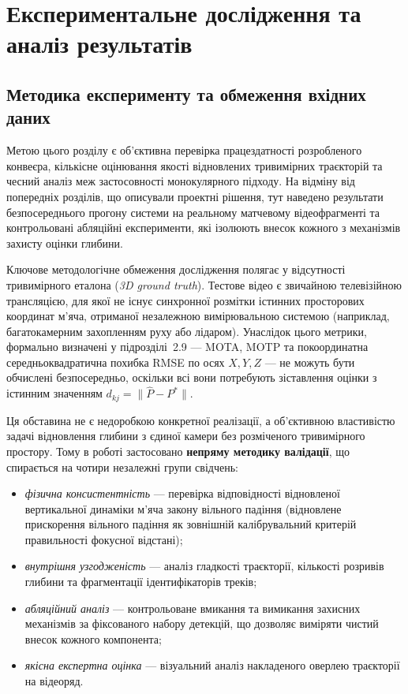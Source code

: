 

\section{Експериментальне дослідження та аналіз результатів}

\subsection{Методика експерименту та обмеження вхідних даних}

Метою цього розділу є об'єктивна перевірка працездатності розробленого конвеєра,
кількісне оцінювання якості відновлених тривимірних траєкторій та чесний аналіз
меж застосовності монокулярного підходу. На відміну від попередніх розділів, що
описували проектні рішення, тут наведено результати безпосереднього прогону системи
на реальному матчевому відеофрагменті та контрольовані абляційні експерименти, які
ізолюють внесок кожного з механізмів захисту оцінки глибини.

Ключове методологічне обмеження дослідження полягає у відсутності тривимірного
еталона (\textit{3D ground truth}). Тестове відео є звичайною телевізійною
трансляцією, для якої не існує синхронної розмітки істинних просторових координат
м'яча, отриманої незалежною вимірювальною системою (наприклад, багатокамерним
захопленням руху або лідаром). Унаслідок цього метрики, формально визначені у
підрозділі~2.9 --- MOTA, MOTP та покоординатна середньоквадратична похибка RMSE по
осях $X, Y, Z$ --- не можуть бути обчислені безпосередньо, оскільки всі вони
потребують зіставлення оцінки з істинним значенням $d_{kj} = \lVert \hat{P} - P^{*} \rVert$.

Ця обставина не є недоробкою конкретної реалізації, а об'єктивною властивістю задачі
відновлення глибини з єдиної камери без розміченого тривимірного простору. Тому в роботі
застосовано \textbf{непряму методику валідації}, що спирається на чотири незалежні
групи свідчень:
\begin{itemize}
    \item \textit{фізична консистентність} --- перевірка відповідності відновленої
    вертикальної динаміки м'яча закону вільного падіння (відновлене прискорення
    вільного падіння як зовнішній калібрувальний критерій правильності фокусної відстані);
    \item \textit{внутрішня узгодженість} --- аналіз гладкості траєкторії, кількості
    розривів глибини та фрагментації ідентифікаторів треків;
    \item \textit{абляційний аналіз} --- контрольоване вмикання та вимикання захисних
    механізмів за фіксованого набору детекцій, що дозволяє виміряти чистий внесок
    кожного компонента;
    \item \textit{якісна експертна оцінка} --- візуальний аналіз накладеного оверлею
    траєкторії на відеоряд.
\end{itemize}

